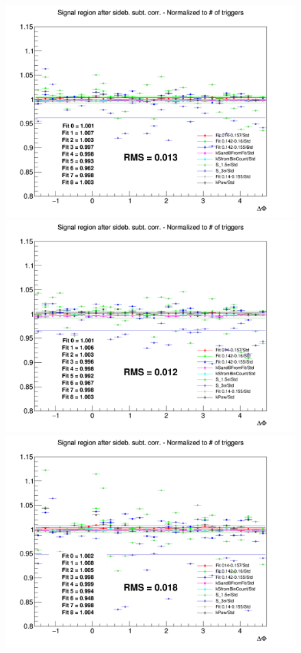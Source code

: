 \begin{figure}
{\includegraphics[width=0.31\linewidth]{figuresVsCent/Dstar/SystSandB/60100_SandB_Syst/Ratio_AzimCorrDistr_Dstar_Canvas_PtIntBins7to9_PoolInt_thr03to99_YIELD_60100.png}}
{\includegraphics[width=0.31\linewidth]{figuresVsCent/Dstar/SystSandB/60100_SandB_Syst/Ratio_AzimCorrDistr_Dstar_Canvas_PtIntBins7to9_PoolInt_thr03to1_YIELD_60100.png}}
{\includegraphics[width=0.31\linewidth]{figuresVsCent/Dstar/SystSandB/60100_SandB_Syst/Ratio_AzimCorrDistr_Dstar_Canvas_PtIntBins7to9_PoolInt_thr1to99_YIELD_60100.png}} \\


\end{figure}
